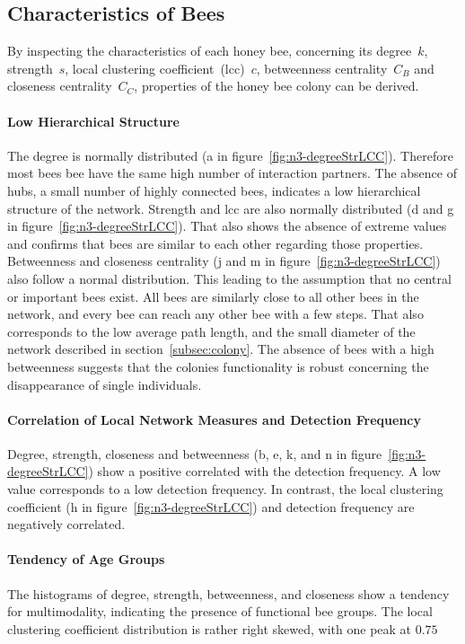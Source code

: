 \subsection{Characteristics of Bees}
By inspecting the characteristics of each honey bee, concerning its degree~$k$, strength~$s$, local clustering coefficient~(lcc)~$c$, betweenness centrality~$C_B$ and closeness centrality~$C_C$, properties of the honey bee colony can be derived.


\paragraph*{Low Hierarchical Structure}
The degree is normally distributed (a in figure~\ref{fig:n3-degreeStrLCC}).
Therefore most bees bee have the same high number of interaction partners.
The absence of hubs, a small number of highly connected bees, indicates a low hierarchical structure of the network.
Strength and lcc are also normally distributed (d and g in figure~\ref{fig:n3-degreeStrLCC}).
That also shows the absence of extreme values and confirms that bees are similar to each other regarding those properties.
Betweenness and closeness centrality (j and m in figure~\ref{fig:n3-degreeStrLCC}) also follow a normal distribution.
This leading to the assumption that no central or important bees exist.
All bees are similarly close to all other bees in the network, and every bee can reach any other bee with a few steps.
That also corresponds to the low average path length, and the small diameter of the network described in section~\ref{subsec:colony}.
The absence of bees with a high betweenness suggests that the colonies functionality is robust concerning the disappearance of single individuals.

\paragraph*{Correlation of Local Network Measures and Detection Frequency}
Degree, strength, closeness and betweenness (b, e, k, and n in figure~\ref{fig:n3-degreeStrLCC}) show a positive correlated with the detection frequency. A low value corresponds to a low detection frequency. In contrast, the local clustering coefficient (h in figure~\ref{fig:n3-degreeStrLCC}) and detection frequency are negatively correlated.

\paragraph*{Tendency of Age Groups}
The histograms of degree, strength, betweenness, and closeness show a tendency for multimodality, indicating the presence of functional bee groups. The local clustering coefficient distribution is rather right skewed, with one peak at $0.75$

